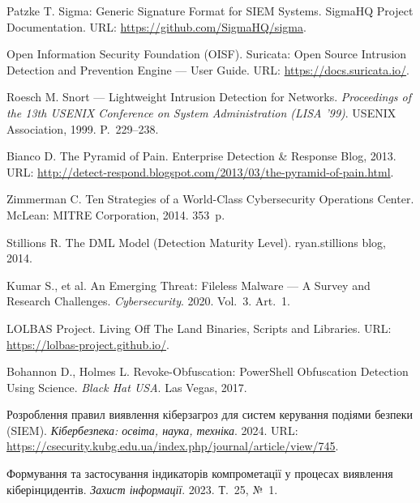 
 Patzke T. Sigma: Generic Signature Format for SIEM Systems. SigmaHQ Project Documentation. URL: \url{https://github.com/SigmaHQ/sigma}.

 Open Information Security Foundation (OISF). Suricata: Open Source Intrusion Detection and Prevention Engine --- User Guide. URL: \url{https://docs.suricata.io/}.

 Roesch M. Snort --- Lightweight Intrusion Detection for Networks. \emph{Proceedings of the 13th USENIX Conference on System Administration (LISA '99)}. USENIX Association, 1999. P.~229--238.

 Bianco D. The Pyramid of Pain. Enterprise Detection \& Response Blog, 2013. URL: \url{http://detect-respond.blogspot.com/2013/03/the-pyramid-of-pain.html}.

 Zimmerman C. Ten Strategies of a World-Class Cybersecurity Operations Center. McLean: MITRE Corporation, 2014. 353~p.

 Stillions R. The DML Model (Detection Maturity Level). ryan.stillions blog, 2014.

 Kumar S., et al. An Emerging Threat: Fileless Malware --- A Survey and Research Challenges. \emph{Cybersecurity}. 2020. Vol.~3. Art.~1.

 LOLBAS Project. Living Off The Land Binaries, Scripts and Libraries. URL: \url{https://lolbas-project.github.io/}.

 Bohannon D., Holmes L. Revoke-Obfuscation: PowerShell Obfuscation Detection Using Science. \emph{Black Hat USA}. Las Vegas, 2017.

 Розроблення правил виявлення кіберзагроз для систем керування подіями безпеки (SIEM). \emph{Кібербезпека: освіта, наука, техніка}. 2024. URL: \url{https://csecurity.kubg.edu.ua/index.php/journal/article/view/745}.

 Формування та застосування індикаторів компрометації у процесах виявлення кіберінцидентів. \emph{Захист інформації}. 2023. Т.~25, №~1.
